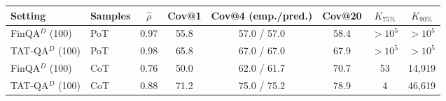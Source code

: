 \begin{tabular}{llcccccc}
\toprule
Setting & Samples & $\hat\rho$ & Cov@1 & Cov@4 (emp./pred.) & Cov@20 & $K_{75\%}$ & $K_{90\%}$ \\
\midrule
FinQA$^{D}$ (100) & PoT & 0.97 & 55.8 & 57.0 / 57.0 & 58.4 & $>10^5$ & $>10^5$ \\
TAT-QA$^{D}$ (100) & PoT & 0.98 & 65.8 & 67.0 / 67.0 & 67.9 & $>10^5$ & $>10^5$ \\
FinQA$^{D}$ (100) & CoT & 0.76 & 50.0 & 62.0 / 61.7 & 70.7 & 53 & 14,919 \\
TAT-QA$^{D}$ (100) & CoT & 0.88 & 71.2 & 75.0 / 75.2 & 78.9 & 4 & 46,619 \\
\bottomrule
\end{tabular}
